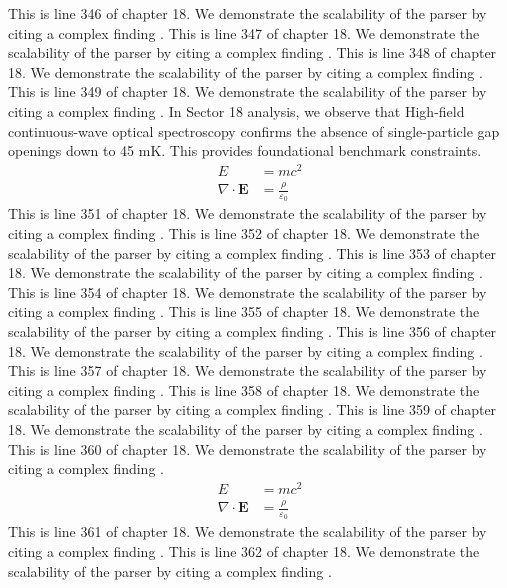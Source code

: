 This is line 346 of chapter 18. We demonstrate the scalability of the parser by citing a complex finding \cite{ref18_346}.
This is line 347 of chapter 18. We demonstrate the scalability of the parser by citing a complex finding \cite{ref18_347}.
This is line 348 of chapter 18. We demonstrate the scalability of the parser by citing a complex finding \cite{ref18_348}.
This is line 349 of chapter 18. We demonstrate the scalability of the parser by citing a complex finding \cite{ref18_349}.
In Sector 18 analysis, we observe that High-field continuous-wave optical spectroscopy confirms the absence of single-particle gap openings down to 45 mK. This provides foundational benchmark constraints.
\begin{align*}
  E &= mc^2 \\
  \nabla \cdot \mathbf{E} &= \frac{\rho}{\varepsilon_0}
\end{align*}
This is line 351 of chapter 18. We demonstrate the scalability of the parser by citing a complex finding \cite{ref18_351}.
This is line 352 of chapter 18. We demonstrate the scalability of the parser by citing a complex finding \cite{ref18_352}.
This is line 353 of chapter 18. We demonstrate the scalability of the parser by citing a complex finding \cite{ref18_353}.
This is line 354 of chapter 18. We demonstrate the scalability of the parser by citing a complex finding \cite{ref18_354}.
This is line 355 of chapter 18. We demonstrate the scalability of the parser by citing a complex finding \cite{ref18_355}.
This is line 356 of chapter 18. We demonstrate the scalability of the parser by citing a complex finding \cite{ref18_356}.
This is line 357 of chapter 18. We demonstrate the scalability of the parser by citing a complex finding \cite{ref18_357}.
This is line 358 of chapter 18. We demonstrate the scalability of the parser by citing a complex finding \cite{ref18_358}.
This is line 359 of chapter 18. We demonstrate the scalability of the parser by citing a complex finding \cite{ref18_359}.
This is line 360 of chapter 18. We demonstrate the scalability of the parser by citing a complex finding \cite{ref18_360}.
\begin{align*}
  E &= mc^2 \\
  \nabla \cdot \mathbf{E} &= \frac{\rho}{\varepsilon_0}
\end{align*}
This is line 361 of chapter 18. We demonstrate the scalability of the parser by citing a complex finding \cite{ref18_361}.
This is line 362 of chapter 18. We demonstrate the scalability of the parser by citing a complex finding \cite{ref18_362}.

